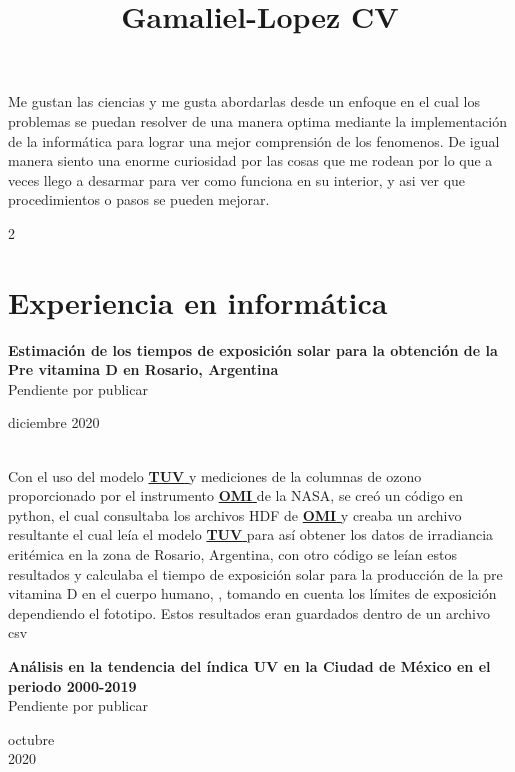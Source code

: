 \documentclass[a3paper,15pt]{adcv}
\title{Gamaliel-Lopez CV}
\newcommand*{\tuv}{\href{https://www2.acom.ucar.edu/modeling/tropospheric-ultraviolet-and-visible-tuv-radiation-model}{\textbf{TUV }}}
\newcommand*{\omi}{\href{https://aura.gsfc.nasa.gov/omi.html}{\textbf{OMI} }}
\begin{document}
\changefontsizes{13.5pt}
Me gustan las ciencias y me gusta abordarlas desde un enfoque en el cual los problemas se puedan resolver de una manera optima mediante la implementación de la 
informática para lograr una mejor comprensión de los fenomenos. De igual manera siento una enorme curiosidad por las cosas que me rodean por lo que a veces llego a desarmar 
para ver como funciona en su interior, y asi ver que procedimientos o pasos se pueden mejorar.
\begin{multicols}{2}
\section{Experiencia en informática}

\begin{minipage}{0.8\linewidth}
  \textbf{Estimación de los tiempos de exposición solar para la obtención de la Pre vitamina D en Rosario, Argentina}\\
  Pendiente por publicar
\end{minipage}
  \begin{minipage}{0.2\linewidth}
    \begin{flushright}
    \vspace{-0.8cm}
    diciembre 2020
    \end{flushright}
  \end{minipage}\\

  Con el uso del modelo \tuv y mediciones de la columnas de ozono proporcionado por el instrumento \omi de la NASA, se creó un código en python, el cual
  consultaba los archivos HDF de \omi y creaba un archivo resultante el cual leía el modelo \tuv para así obtener los datos de irradiancia eritémica
   en la zona de Rosario, Argentina, con otro código se leían estos resultados y calculaba el tiempo de exposición solar para 
  la producción de la pre vitamina D en el cuerpo humano,  , tomando en cuenta los límites de exposición dependiendo el fototipo. Estos resultados eran guardados dentro de un archivo csv
 \\

  \begin{minipage}{0.8\linewidth}
    \textbf{Análisis en la tendencia del índica UV en la Ciudad de México en el periodo 2000-2019}\\ 
    Pendiente por publicar
  \end{minipage}
    \begin{minipage}{0.2\linewidth}
      \begin{flushright}
        \vspace{-0.7cm}
      octubre\\ 2020
      \end{flushright}
    \end{minipage}\\
    

\end{multicols}
\end{document}
